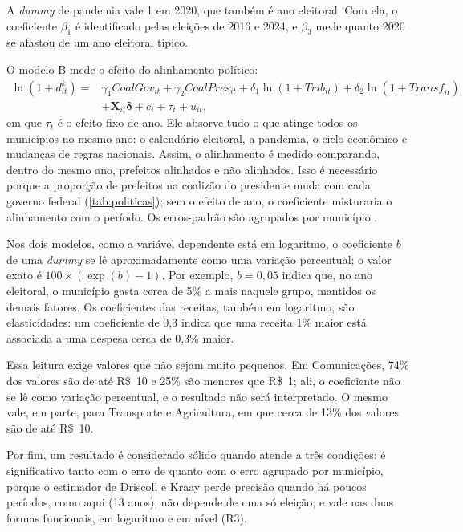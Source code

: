 A \textit{dummy} de pandemia vale 1 em 2020, que também é ano eleitoral. Com ela, o coeficiente $\beta_1$ é identificado pelas eleições de 2016 e 2024, e $\beta_3$ mede quanto 2020 se afastou de um ano eleitoral típico.

O modelo B mede o efeito do alinhamento político:
\begin{equation}\label{eq:modeloB}
\begin{split}
\ln(1 + d^k_{it}) = {} & \gamma_1 \mathit{CoalGov}_{it} + \gamma_2 \mathit{CoalPres}_{it} + \delta_1 \ln(1 + \mathit{Trib}_{it}) + \delta_2 \ln(1 + \mathit{Transf}_{it}) \\
& + \mathbf{X}_{it}\boldsymbol{\delta} + c_i + \tau_t + u_{it},
\end{split}
\end{equation}
em que $\tau_t$ é o efeito fixo de ano. Ele absorve tudo o que atinge todos os municípios no mesmo ano: o calendário eleitoral, a pandemia, o ciclo econômico e mudanças de regras nacionais. Assim, o alinhamento é medido comparando, dentro do mesmo ano, prefeitos alinhados e não alinhados. Isso é necessário porque a proporção de prefeitos na coalizão do presidente muda com cada governo federal (\autoref{tab:politicas}); sem o efeito de ano, o coeficiente misturaria o alinhamento com o período. Os erros-padrão são agrupados por município \parencite[p.~274--276]{wooldridge2002}.

Nos dois modelos, como a variável dependente está em logaritmo, o coeficiente $b$ de uma \textit{dummy} se lê aproximadamente como uma variação percentual; o valor exato é $100 \times (\exp(b) - 1)$. Por exemplo, $b = 0{,}05$ indica que, no ano eleitoral, o município gasta cerca de 5\% a mais naquele grupo, mantidos os demais fatores. Os coeficientes das receitas, também em logaritmo, são elasticidades: um coeficiente de 0,3 indica que uma receita 1\% maior está associada a uma despesa cerca de 0,3\% maior.

Essa leitura exige valores que não sejam muito pequenos. Em Comunicações, 74\% dos valores são de até R\$~10 e 25\% são menores que R\$~1; ali, o coeficiente não se lê como variação percentual, e o resultado não será interpretado. O mesmo vale, em parte, para Transporte e Agricultura, em que cerca de 13\% dos valores são de até R\$~10.

Por fim, um resultado é considerado sólido quando atende a três condições: é significativo tanto com o erro de \textcite{driscoll1998} quanto com o erro agrupado por município, porque o estimador de Driscoll e Kraay perde precisão quando há poucos períodos, como aqui (13 anos); não depende de uma só eleição; e vale nas duas formas funcionais, em logaritmo e em nível (R3).

